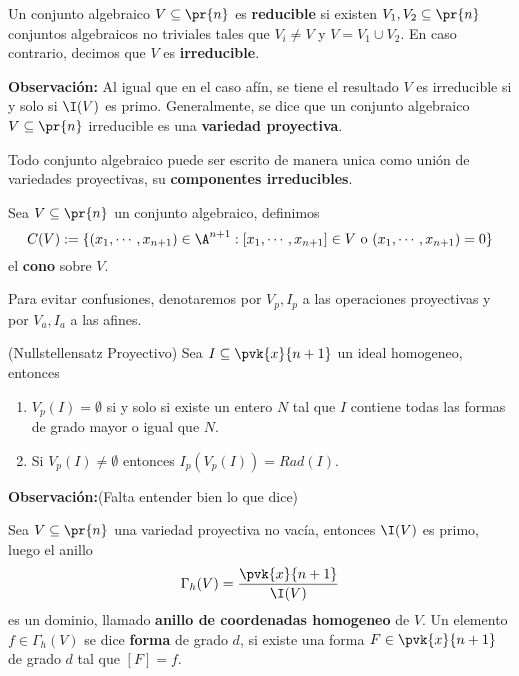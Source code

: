 \documentclass{article}
\begin{document}
\begin{dfn}
    Un conjunto algebraico $V\subseteq\pr{n}$ es \textbf{reducible} si existen 
    $V_{1},V_{2}\subseteq\pr{n}$ conjuntos algebraicos no triviales tales que $V_{i}\neq V$ y 
    $V=V_{1}\cup V_{2}$. En caso contrario, decimos que $V$ es \textbf{irreducible}.
\end{dfn}
\noindent\textbf{Observación:} Al igual que en el caso afín, se tiene el resultado $V$ es 
irreducible si y solo si $\I(V)$ es primo. Generalmente, se dice que un conjunto algebraico
$V\subseteq\pr{n}$ irreducible es una \textbf{variedad proyectiva}.

\vspace{4mm}
\noindent Todo conjunto algebraico puede ser escrito de manera unica como unión de variedades 
proyectivas, su \textbf{componentes irreducibles}.
\begin{dfn}
    Sea $V\subseteq\pr{n}$ un conjunto algebraico, definimos
    \begin{equation*}
        C(V):=\{(x_{1},\cdots,x_{n+1})\in\A^{n+1}:[x_{1},\cdots,x_{n+1}]\in V\text{ o }
        (x_{1},\cdots,x_{n+1})=0\}
    \end{equation*}
    el \textbf{cono} sobre $V$.
\end{dfn}
\noindent Para evitar confusiones, denotaremos por $V_{p},I_{p}$ a las operaciones proyectivas y
por $V_{a},I_{a}$ a las afines.
\begin{teo}
    (Nullstellensatz Proyectivo) Sea $I\subseteq\pvk{x}{n+1}$ un ideal homogeneo, entonces
    \begin{enumerate}
        \item $V_{p}(I)=\emptyset$ si y solo si existe un entero $N$ tal que $I$ contiene todas
        las formas de grado mayor o igual que $N$.

        \item Si $V_{p}(I)\neq\emptyset$ entonces $I_{p}(V_{p}(I))=Rad(I)$.
    \end{enumerate}
\end{teo}
\noindent\textbf{Observación:}(Falta entender bien lo que dice)
\begin{dfn}
    Sea $V\subseteq\pr{n}$ una variedad proyectiva no vacía, entonces $\I(V)$ es primo, luego 
    el anillo 
    \begin{equation*}
        \Gamma_{h}(V)=\frac{\pvk{x}{n+1}}{\I(V)}
    \end{equation*}
    es un dominio, llamado \textbf{anillo de coordenadas homogeneo} de $V$. Un elemento 
    $f\in\Gamma_{h}(V)$ se dice \textbf{forma} de grado $d$, si existe una forma $F\in\pvk{x}{n+1}$ 
    de grado $d$ tal que $[F]=f$.
\end{dfn}
\end{document}
